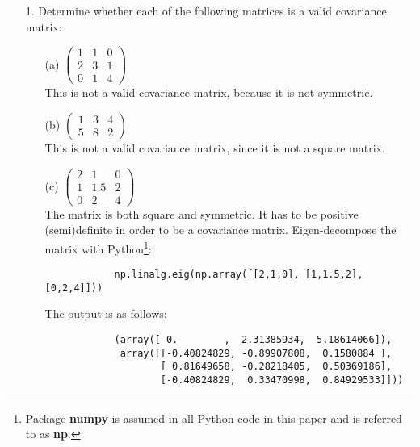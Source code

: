 \documentclass{article}
\begin{document}
\begin{enumerate}
    \item[1. ] Determine whether each of the following matrices is a valid covariance matrix:
    
        \begin{enumerate}
            \item [(a)] $\begin{pmatrix} 1 &1 &0 \\ 2 &3 &1 \\ 0 &1 &4 \end{pmatrix}$ \\
            
            This is not a valid covariance matrix, because it is not symmetric. \\
            
            \item[(b)] $\begin{pmatrix}1 &3 &4 \\ 5 &8 &2 \end{pmatrix}$ \\
            
            This is not a valid covariance matrix, since it is not a square matrix. \\
            
            \item[(c)] $\begin{pmatrix} 2 &1 &0 \\ 1 &1.5 &2 \\ 0 &2 &4 \end{pmatrix}$ \\
            
            The matrix is both square and symmetric. It has to be positive (semi)definite in order to be a covariance matrix. Eigen-decompose the matrix with Python\footnote{Package \textbf{numpy} is assumed in all Python code in this paper and is referred to as \textbf{np}.}:
            
            \begin{verbatim}
            np.linalg.eig(np.array([[2,1,0], [1,1.5,2], [0,2,4]]))
            \end{verbatim}

            The output is as follows:
            
            \begin{verbatim}
            (array([ 0.        ,  2.31385934,  5.18614066]),
             array([[-0.40824829, -0.89907808,  0.1580884 ],
                    [ 0.81649658, -0.28218405,  0.50369186],
                    [-0.40824829,  0.33470998,  0.84929533]]))
            \end{verbatim}
            

\end{enumerate}
\end{enumerate}
\end{document}
